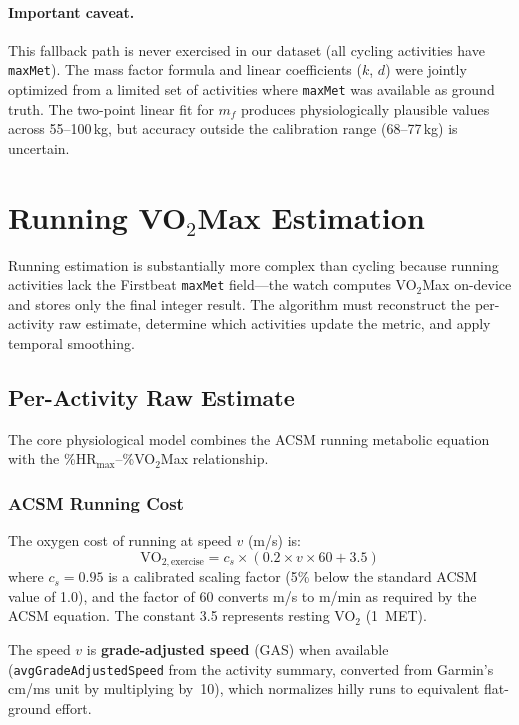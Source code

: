 \documentclass[11pt,a4paper]{article}
\begin{document}
\paragraph{Important caveat.}
This fallback path is never exercised in our dataset (all cycling activities have \texttt{maxMet}).
The mass factor formula and linear coefficients ($k$, $d$) were jointly optimized from a limited set of activities where \texttt{maxMet} was available as ground truth.
The two-point linear fit for $m_f$ produces physiologically plausible values across 55--100\,kg, but accuracy outside the calibration range (68--77\,kg) is uncertain.


\section{Running VO$_2$Max Estimation}
\label{sec:running}

Running estimation is substantially more complex than cycling because running activities lack the Firstbeat \texttt{maxMet} field---the watch computes VO$_2$Max on-device and stores only the final integer result.
The algorithm must reconstruct the per-activity raw estimate, determine which activities update the metric, and apply temporal smoothing.

\subsection{Per-Activity Raw Estimate}
\label{sec:raw-estimate}

The core physiological model combines the ACSM running metabolic equation with the \%HR$_{\text{max}}$--\%VO$_2$Max relationship.

\subsubsection{ACSM Running Cost}

The oxygen cost of running at speed $v$ (m/s) is:
\begin{equation}
\text{VO}_{2,\text{exercise}} = c_s \times (0.2 \times v \times 60 + 3.5)
\label{eq:acsm}
\end{equation}
where $c_s = 0.95$ is a calibrated scaling factor (5\% below the standard ACSM value of 1.0), and the factor of 60 converts m/s to m/min as required by the ACSM equation.
The constant 3.5 represents resting VO$_2$ (1~MET).

The speed $v$ is \textbf{grade-adjusted speed} (GAS) when available (\texttt{avgGrade\-AdjustedSpeed} from the activity summary, converted from Garmin's cm/ms unit by multiplying by~10), which normalizes hilly runs to equivalent flat-ground effort.
\end{document}
